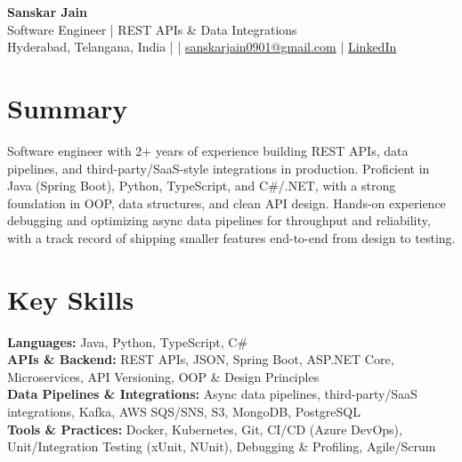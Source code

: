\documentclass[10pt,letterpaper]{article}
\begin{document}
\begin{center}
    {\Large \textbf{Sanskar Jain}} \\
    Software Engineer | REST APIs \& Data Integrations \\
    Hyderabad, Telangana, India \enspace |  \enspace | \enspace
    \href{mailto:sanskarjain0901@gmail.com}{sanskarjain0901@gmail.com} \enspace | \enspace
    \href{https://www.linkedin.com/in/sanskar-jain0901/}{LinkedIn}
\end{center}

\section*{Summary}
Software engineer with 2+ years of experience building REST APIs, data pipelines, and third-party/SaaS-style integrations in production. Proficient in Java (Spring Boot), Python, TypeScript, and C\#/.NET, with a strong foundation in OOP, data structures, and clean API design. Hands-on experience debugging and optimizing async data pipelines for throughput and reliability, with a track record of shipping smaller features end-to-end from design to testing.

\section*{Key Skills}
\textbf{Languages:} Java, Python, TypeScript, C\# \\
\textbf{APIs \& Backend:} REST APIs, JSON, Spring Boot, ASP.NET Core, Microservices, API Versioning, OOP \& Design Principles \\
\textbf{Data Pipelines \& Integrations:} Async data pipelines, third-party/SaaS integrations, Kafka, AWS SQS/SNS, S3, MongoDB, PostgreSQL \\
\textbf{Tools \& Practices:} Docker, Kubernetes, Git, CI/CD (Azure DevOps), Unit/Integration Testing (xUnit, NUnit), Debugging \& Profiling, Agile/Scrum
\end{document}
